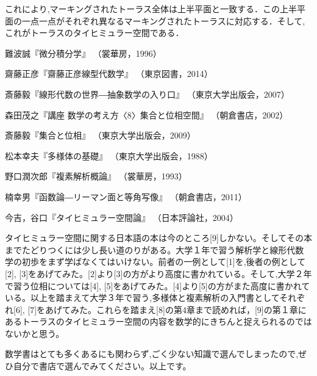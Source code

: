 \begin{figure}[h]
\begin{minipage}{0.5\hsize}
\end{minipage}
\begin{minipage}{0.5\hsize}
\end{minipage}
\end{figure}
これにより,マーキングされたトーラス全体は上半平面と一致する．この上半平面の一点一点がそれぞれ異なるマーキングされたトーラスに対応する．そして,これがトーラスのタイヒミュラー空間である．
\begin{thebibliography}{9}
\item
難波誠『微分積分学』
（裳華房，1996）
\item
齋藤正彦『齋藤正彦線型代数学』
（東京図書，2014）
\item
斎藤毅『線形代数の世界―抽象数学の入り口』
（東京大学出版会，2007）
\item
森田茂之『講座 数学の考え方〈8〉集合と位相空間』
（朝倉書店，2002）
\item
斎藤毅『集合と位相』
（東京大学出版会，2009）
\item
松本幸夫『多様体の基礎』
（東京大学出版会，1988）
\item
野口潤次郎『複素解析概論』
（裳華房，1993）
\item
楠幸男『函数論―リーマン面と等角写像』
（朝倉書店，2011）
\item
今吉，谷口『タイヒミュラー空間論』
（日本評論社，2004）
\end{thebibliography}

タイヒミュラー空間に関する日本語の本は今のところ[9]しかない。そしてその本までたどりつくには少し長い道のりがある。大学１年で習う解析学と線形代数学の初歩をまず学ばなくてはいけない。前者の一例として[1]を,後者の例として[2], [3]をあげてみた。[2]より[3]の方がより高度に書かれている。そして,大学２年で習う位相については[4], [5]をあげてみた。[4]より[5]の方がまた高度に書かれている。以上を踏まえて大学３年で習う,多様体と複素解析の入門書としてそれぞれ[6], [7]をあげてみた。これらを踏まえ[8]の第4章まで読めれば，[9]の第１章にあるトーラスのタイヒミュラー空間の内容を数学的にきちんと捉えられるのではないかと思う。

数学書はとても多くあるにも関わらず,ごく少ない知識で選んでしまったので,ぜひ自分で書店で選んでみてください。以上です。







